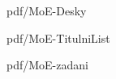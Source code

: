 \documentclass[%
  12pt,       				%
  a4paper,    				%
  oneside,      			%
	unicode,						%
]{report}				    	%
\begin{document}
\pagestyle{empty} %

  {pdf/MoE-Desky}%
 \oddpage %
\setcounter{page}{1} %

  {pdf/MoE-TitulniList}%
 \oddpage  %
   
  {pdf/MoE-zadani}%
\oddpage%

\makeabstract



\makedeclaration

\makeacknowledgement

\tableofcontents

\listoffigures
\end{document}
